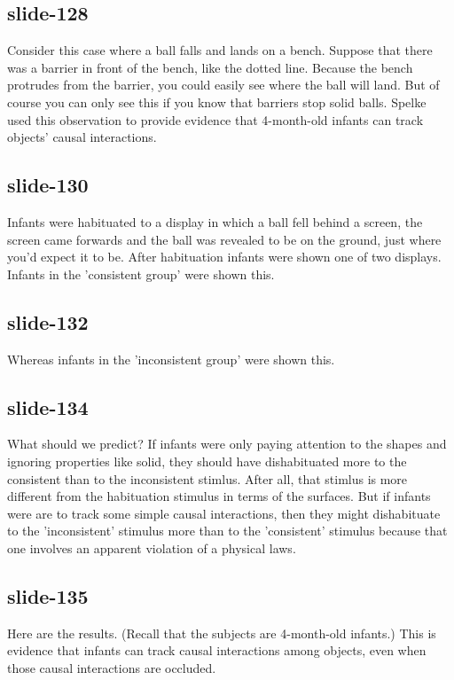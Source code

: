 \documentclass[12pt,\papersize]{extarticle}
\begin{document}
 
\subsection{slide-128}
Consider this case where a ball falls and lands on a bench.
Suppose that there was a barrier in front of the bench, like the dotted line.
Because the bench protrudes from the barrier, you could easily see where the ball will land.
But of course you can only see this if you know that barriers stop solid balls.
Spelke used this observation to provide evidence that 4-month-old infants can track objects' causal interactions.
 
 
\subsection{slide-130}
Infants were habituated to a display in which a ball fell behind a screen, the screen came forwards and the ball was revealed to be on the ground, just where you'd expect it to be.
After habituation infants were shown one of two displays.
Infants in the 'consistent group' were shown this.
 
 
\subsection{slide-132}
Whereas infants in the 'inconsistent group' were shown this.
 
 
\subsection{slide-134}
What should we predict?
If infants were only paying attention to the shapes and ignoring properties like solid, they should have dishabituated more to the consistent than to the inconsistent stimlus.
After all, that stimlus is more different from the habituation stimulus in terms of the surfaces.
But if infants were are to track some simple causal interactions, then they might dishabituate to the 'inconsistent' stimulus more than to the 'consistent' stimulus because that one involves an apparent violation of a physical laws.
 
 
\subsection{slide-135}
Here are the results.
(Recall that the subjects are 4-month-old infants.)
This is evidence that infants can track causal interactions among objects, even when those causal interactions are occluded.
 
\end{document}
